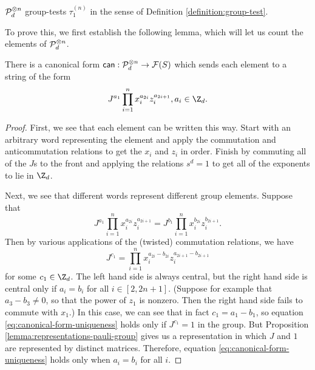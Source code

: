 \begin{prop}\label{prop:representations-pauli-group}
	$\mathcal P_d^{\otimes n}$ group-tests $\tau_1^{(n)}$ in the sense of Definition \ref{definition:group-test}.
\end{prop}

To prove this, we first establish the following lemma, which will let us count the elements of $\mathcal P_d^{\otimes n}$.

\begin{lemma}
\label{lemma:canonical-form}
	There is a canonical form $\operatorname*{\mathsf{can}}: \mathcal P_d^{\otimes n} \to \mathcal F(S)$ which sends each element to a string of the form
	\begin{equation}
	 	J^{a_1}\prod_{i=1}^nx_i^{a_{2i}}z_i^{a_{2i+1}}, a_i\in \Z_d.
	 \end{equation}
\end{lemma}
\begin{proof}
	First, we see that each element can be written this way. Start with an arbitrary word representing the element and apply the commutation and anticommutation relations to get the $x_i$ and $z_i$ in order. Finish by commuting all of the $J$s to the front and applying the relations $s^d = 1$ to get all of the exponents to lie in $\Z_d$. 

	Next, we see that different words represent different group elements. Suppose that 
 	\begin{equation}\label{eq:canonical-form}
 		J^{a_1}\prod_{i=1}^nx_i^{a_{2i}}z_i^{a_{2i+1}} = J^{b_1}\prod_{i=1}^nx_i^{b_{2i}}z_i^{b_{2i+1}}.
 	\end{equation}
 	Then by various applications of the (twisted) commutation relations, we have
 	\begin{equation}\label{eq:canonical-form-uniqueness}
 		J^{c_1} = \prod_{i=1}^nx_i^{a_{2i} - b_{2i}}z_i^{a_{2i+1}-b_{2i+1}}
 	\end{equation}
 	for some $c_1 \in \Z_d$. The left hand side is always central, but the right hand side is central only if $a_i = b_i$ for all $i\in [2,2n+1]$. 
 	(Suppose for example that $a_3 - b_3 \neq 0$, so that the power of $z_1$ is nonzero. Then the right hand side fails to commute with $x_1$.) 
 	In this case, we can see that in fact $c_1 = a_1 - b_1$, so equation \eqref{eq:canonical-form-uniqueness} holds only if $J^{c_1} = 1$ in the group. 
 	 But Proposition \ref{lemma:representations-pauli-group} gives us a representation in which $J$ and $1$ are represented by distinct matrices. Therefore, equation \eqref{eq:canonical-form-uniqueness} holds only when $a_i = b_i$ for all $i$.
\end{proof}

